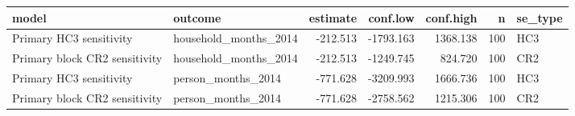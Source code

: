 
\begin{tabular}{llrrrrl}
\toprule
model & outcome & estimate & conf.low & conf.high & n & se\_type\\
\midrule
Primary HC3 sensitivity & household\_months\_2014 & -212.513 & -1793.163 & 1368.138 & 100 & HC3\\
Primary block CR2 sensitivity & household\_months\_2014 & -212.513 & -1249.745 & 824.720 & 100 & CR2\\
Primary HC3 sensitivity & person\_months\_2014 & -771.628 & -3209.993 & 1666.736 & 100 & HC3\\
Primary block CR2 sensitivity & person\_months\_2014 & -771.628 & -2758.562 & 1215.306 & 100 & CR2\\
\bottomrule
\end{tabular}
